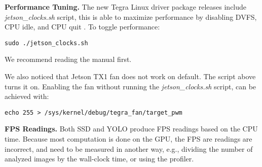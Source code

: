\textbf{Performance Tuning.}
The new Tegra Linux driver package releases include \textit{jetson\_clocks.sh} script, this is able to maximize performance by disabling DVFS, CPU idle, and CPU quit \cite{tegradriverpack242}. To toggle performance:
\begin{lstlisting} 
sudo ./jetson_clocks.sh
\end{lstlisting}
We recommend reading the manual first.

We also noticed that Jetson TX1 fan does not work on default. The script above turns it on. Enabling the fan without running the \textit{jetson\_clocks.sh} script, can be achieved with:
\begin{lstlisting} 
echo 255 > /sys/kernel/debug/tegra_fan/target_pwm
\end{lstlisting}

\textbf{FPS Readings.}
Both SSD and YOLO produce FPS readings based on the CPU time. Because most computation is done on the GPU, the FPS are readings are incorrect, and need to be measured in another way, e.g., dividing the number of analyzed images by the wall-clock time, or using the profiler.
